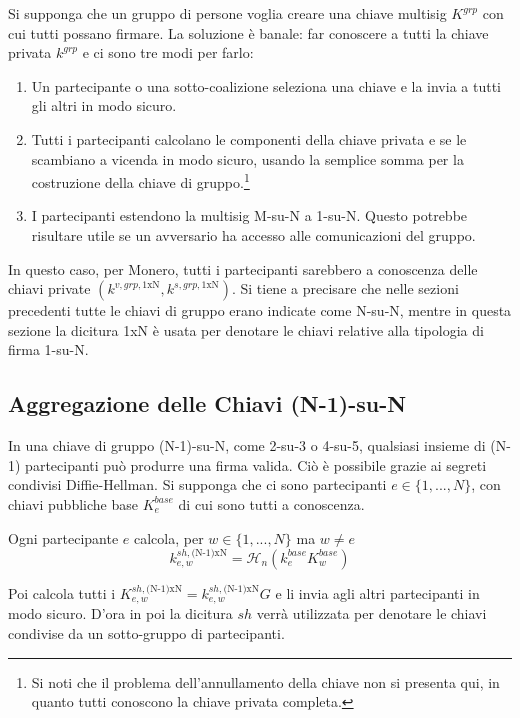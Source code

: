 Si supponga che un gruppo di persone voglia creare una chiave multisig $K^{grp}$ con cui tutti possano firmare. La soluzione è banale: far conoscere a tutti la chiave privata $k^{grp}$ e ci sono tre modi per farlo:
\begin{enumerate}
    \item Un partecipante o una sotto-coalizione seleziona una chiave e la invia a tutti gli altri in modo sicuro.
    \item Tutti i partecipanti calcolano le componenti della chiave privata e se le scambiano a vicenda in modo sicuro, usando la semplice somma per la costruzione della chiave di gruppo.\footnote{Si noti che il problema dell'annullamento della chiave non si presenta qui, in quanto tutti conoscono la chiave privata completa.}
    \item I partecipanti estendono la multisig M-su-N a 1-su-N. Questo potrebbe risultare utile se un avversario ha accesso alle comunicazioni del gruppo.
\end{enumerate}

In questo caso, per Monero, tutti i partecipanti sarebbero a conoscenza delle chiavi private $(k^{v,grp,{1\textrm{xN}}},k^{s,grp,{1\textrm{xN}}})$. Si tiene a precisare che nelle sezioni precedenti tutte le chiavi di gruppo erano indicate come N-su-N, mentre in questa sezione la dicitura 1xN è usata per denotare le chiavi relative alla tipologia di firma 1-su-N.


\subsection{Aggregazione delle Chiavi (N-1)-su-N}
\label{sec:n-1-of-n}

In una chiave di gruppo (N-1)-su-N, come 2-su-3 o 4-su-5, qualsiasi insieme di (N-1) partecipanti può produrre una firma valida. Ciò è possibile grazie ai segreti condivisi Diffie-Hellman. Si supponga che ci sono partecipanti $e \in \{1,...,N\}$, con chiavi pubbliche base $K^{base}_e$ di cui sono tutti a conoscenza.

Ogni partecipante $e$ calcola, per $w \in \{1,...,N\}$ ma $w \neq e$\vspace{.175cm}
\[k^{sh,\textrm{(N-1)xN}}_{e,w} = \mathcal{H}_n(k^{base}_e K^{base}_w)\]

Poi calcola tutti i $K^{sh,\textrm{(N-1)xN}}_{e,w} = k^{sh,\textrm{(N-1)xN}}_{e,w} G$ e li invia agli altri partecipanti in modo sicuro. D'ora in poi la dicitura $sh$ verrà utilizzata per denotare le chiavi condivise da un sotto-gruppo di partecipanti.

